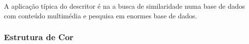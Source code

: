 A aplicação típica do descritor é na a busca de similaridade numa base de dados com conteúdo multimédia e pesquisa em enormes base de dados. 

%
%
%

\subsubsection{Estrutura de Cor}

